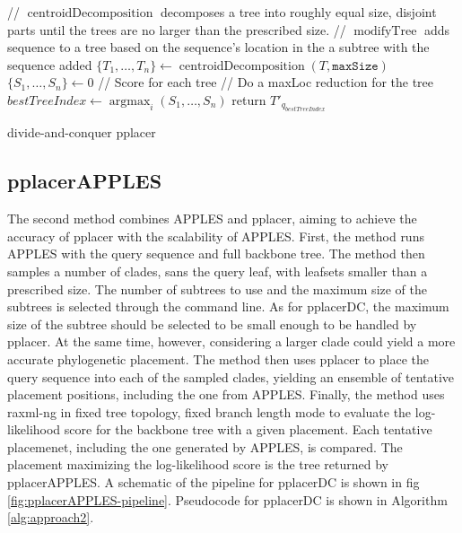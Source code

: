 \documentclass[10pt]{article}
\begin{document}
\begin{algorithm}[!htb]
\SetAlgoLined
{}
 // $\operatorname{centroidDecomposition}$ decomposes a tree into roughly equal size, disjoint parts until the trees are no larger than the prescribed size.\;
 // $\operatorname{modifyTree}$ adds sequence to a tree based on the sequence's location in the a subtree with the sequence added\;
 $\{T_1,\dots,T_n\} \leftarrow \operatorname{centroidDecomposition}(T,\texttt{maxSize})$\;
 $\{S_1, \dots, S_n\} \leftarrow 0$ // Score for each tree\;
 // Do a maxLoc reduction for the tree\;
 $bestTreeIndex \leftarrow \operatorname{argmax}_{i} (S_1,\dots,S_n)$\;
 return $T'_{q_{bestTreeIndex}}$\;
 \caption{divide-and-conquer pplacer}
 \label{alg:approach1}
\end{algorithm}

\subsection{pplacerAPPLES}

The second method combines APPLES and pplacer, aiming to achieve the accuracy of pplacer with the scalability of APPLES.
First, the method runs APPLES with the query sequence and full backbone tree.
The method then samples a number of clades, sans the query leaf, with leafsets smaller
than a prescribed size.
The number of subtrees to use and the maximum size of the subtrees is selected through the command line.
As for pplacerDC, the maximum size of the subtree should be selected to be small enough to be handled by pplacer.
At the same time, however, considering a larger clade could yield a more accurate phylogenetic placement.
The method then uses pplacer to place the query sequence into each of the sampled clades, yielding
an ensemble of tentative placement positions, including the one from APPLES.
Finally, the method uses raxml-ng in fixed tree topology, fixed branch length mode to evaluate
the log-likelihood score for the backbone tree with a given placement.
Each tentative placemenet, including the one generated by APPLES, is compared.
The placement maximizing the log-likelihood score is the tree returned by pplacerAPPLES.
A schematic of the pipeline for pplacerDC is shown in fig \ref{fig:pplacerAPPLES-pipeline}.
Pseudocode for pplacerDC is shown in Algorithm \ref{alg:approach2}.
\end{document}
